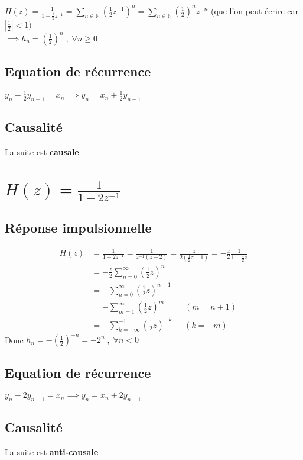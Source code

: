 \documentclass[twocolumn]{article}
\begin{document}
$H(z) = \frac{1}{1 - \frac{1}{2}z^{-1}} = \displaystyle\sum_{n \in \mathbb{N}}{(\frac{1}{2}z^{-1})^{n}} = \displaystyle\sum_{n \in \mathbb{N}}{(\frac{1}{2})^n z^{-n}}$ (que l'on peut écrire car $ |\frac{1}{2}| < 1)$ \\ $\implies h_n = (\frac{1}{2})^n \;,\; \forall n \geq 0$
\subsection*{Equation de récurrence}
$y_n - \frac{1}{2}y_{n-1}= x_n \implies y_n = x_n + \frac{1}{2}y_{n-1} $
\subsection*{Causalité}
La suite est \textbf{causale}
\section{$H(z) = \frac{1}{1 - 2z^{-1}}$}
\subsection*{Réponse impulsionnelle}
\begin{equation*}\begin{split} 
H(z) &= \frac{1}{1 - 2z^{-1}} = \frac{1}{z^{-1}(z-2)} = \frac{z}{2(\frac{1}{2}z-1)} = -\frac{z}{2} \frac{1}{1-\frac{1}{2}z} \\
&= -\frac{z}{2} \displaystyle\sum_{n=0}^\infty{(\frac{1}{2}z)^{n}} \\
&= -\displaystyle\sum_{n=0}^\infty{(\frac{1}{2}z)^{n+1}} \\
&= -\displaystyle\sum_{m=1}^\infty{(\frac{1}{2}z)^{m}} \hspace{30pt} (m = n+1)\\
&= -\displaystyle\sum_{k=-\infty}^{-1}{(\frac{1}{2}z)^{-k}} \hspace{18pt} (k = -m)
\end{split}\end{equation*}
Donc $h_n = -(\frac{1}{2})^{-n} = -2^n \;,\; \forall n < 0$
\subsection*{Equation de récurrence}
$y_n - 2 y_{n-1} = x_n \implies y_n = x_n +2 y_{n-1} $ 
\subsection*{Causalité}
La suite est \textbf{anti-causale}
\end{document}
